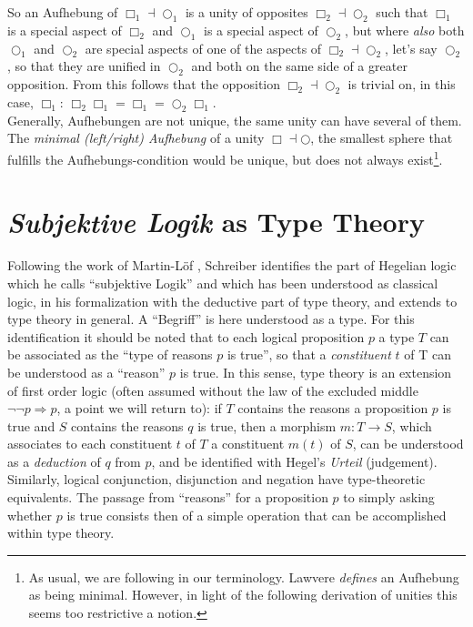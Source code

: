 \documentclass{article}
\begin{document}
So an Aufhebung of $\Box_1\dashv\bigcirc_1$ is a unity of opposites $\Box_2\dashv\bigcirc_2$ such that
$\Box_1$ is a special aspect of $\Box_2$ and $\bigcirc_1$ is a special aspect of $\bigcirc_2$, but where
\emph{also} both $\bigcirc_1$ and $\bigcirc_2$ are special aspects of one of the aspects of $\Box_2\dashv\bigcirc_2$,
let's say $\bigcirc_2$, so that they are unified in $\bigcirc_2$ and both on the same side of a greater
opposition. From this follows that the opposition $\Box_2\dashv\bigcirc_2$ is trivial on, in this case,
$\Box_1$: $\Box_2\Box_1=\Box_1=\bigcirc_2\Box_1$. \\

Generally, Aufhebungen are not unique, the same unity can have several of them. The \emph{minimal (left/right)
Aufhebung} of a unity $\Box\dashv\bigcirc$, the smallest sphere that fulfills the Aufhebungs-condition
would be unique, but does not always exist\footnote{As usual, we are following \cite{nlabsol} in our terminology.
Lawvere \emph{defines} an Aufhebung as being minimal\cite{Lawvere92}. However, in light of the following
derivation of unities this seems too restrictive a notion.}.


\section{\emph{Subjektive Logik} as Type Theory}
Following the work of Martin-Löf \cite{Loef96}, Schreiber identifies the part of Hegelian logic which
he calls ``subjektive Logik'' and which has been understood as classical logic, in his formalization with
the deductive part of type theory, and extends to type theory in general. A ``Begriff'' is here understood
as a type. For this identification it should be noted that to each logical proposition $p$ a type $T$
can be associated as the ``type of reasons $p$ is true'', so that a \emph{constituent} $t$ of T can be
understood as a ``reason'' $p$ is true. In this sense, type theory is an extension of first order logic
(often assumed without the law of the excluded middle $\neg\neg p \Rightarrow p$, a point we will return
to): if $T$ contains the reasons a proposition $p$ is true and $S$ contains the reasons $q$ is true, then
a morphism $m:T\rightarrow S$, which associates to each constituent $t$ of $T$ a constituent $m(t)$ of
$S$, can be understood as a \emph{deduction} of $q$ from $p$, and be identified with Hegel's \emph{Urteil}
(judgement). Similarly, logical conjunction, disjunction and negation have type-theoretic equivalents.
The passage from ``reasons'' for a proposition $p$ to simply asking whether $p$ is true consists then
of a simple operation that can be accomplished within type theory. \\
\end{document}
